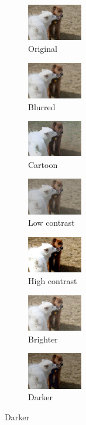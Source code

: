 \begin{figure}[t]
	\centering
	\captionsetup[subfigure]{labelformat=empty}
		\begin{subfigure}[b]{0.1\textwidth}
		\centering
		\includegraphics[width=2.4cm]{orig - filter.jpeg}
		\caption{Original}
		\end{subfigure}
		\hfill
		\begin{subfigure}[b]{0.1\textwidth}
			\includegraphics[width=2.4cm]{orig - filter - blur.jpeg}
			\caption{Blurred}
		\end{subfigure}
		\hfill
		\begin{subfigure}[b]{0.1\textwidth}
			\includegraphics[width=2.4cm]{orig - filter - cartoon.jpeg}
			\caption{Cartoon}
		\end{subfigure}
		\hfill
		\begin{subfigure}[b]{0.1\textwidth}
			\includegraphics[width=2.4cm]{orig - filter - man contr (2).jpg}
			\caption{Low contrast}
		\end{subfigure}
		\hfill
		\begin{subfigure}[b]{0.1\textwidth}
			\includegraphics[width=2.4cm]{orig - filter - man contr (1).jpg}
			\caption{High contrast}
		\end{subfigure}
		\hfill
		\begin{subfigure}[b]{0.1\textwidth}
			\includegraphics[width=2.4cm]{orig - filter - lumin (1).jpeg}
			\caption{Brighter}
		\end{subfigure}
		\hfill
		\begin{subfigure}[b]{0.1\textwidth}
			\includegraphics[width=2.4cm]{orig - filter - lumin (2).jpeg}
			\caption{Darker}
		\end{subfigure}
	

\end{figure}
